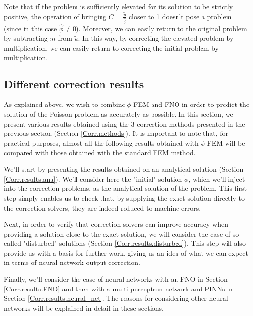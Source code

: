 \begin{Rem}
	Note that if the problem is sufficiently elevated for its solution to be strictly positive, the operation of bringing $C=\frac{\tilde{u}}{\hat{\phi}}$ closer to 1 doesn't pose a problem (since in this case $\hat{\phi}\ne 0$). Moreover, we can easily return to the original problem by subtracting $m$ from $\tilde{u}$. In this way, by correcting the elevated problem by multiplication, we can easily return to correcting the initial problem by multiplication.  
\end{Rem}

\subsection{Different correction results} \label{Corr.results}

As explained above, we wish to combine $\phi$-FEM and FNO in order to predict the solution of the Poisson problem as accurately as possible. In this section, we present various results obtained using the 3 correction methods presented in the previous section (Section \ref{Corr.methods}). It is important to note that, for practical purposes, almost all the following results obtained with $\phi$-FEM will be compared with those obtained with the standard FEM method.

We'll start by presenting the results obtained on an analytical solution (Section \ref{Corr.results.ana}). We'll consider here the "initial" solution $\tilde{\phi}$, which we'll inject into the correction problems, as the analytical solution of the problem. This first step simply enables us to check that, by supplying the exact solution directly to the correction solvers, they are indeed reduced to machine errors.

Next, in order to verify that correction solvers can improve accuracy when providing a solution close to the exact solution, we will consider the case of so-called "disturbed" solutions (Section \ref{Corr.results.disturbed}). This step will also provide us with a basis for further work, giving us an idea of what we can expect in terms of neural network output correction.

Finally, we'll consider the case of neural networks with an FNO in Section \ref{Corr.results.FNO} and then with a multi-perceptron network and PINNs in Section \ref{Corr.results.neural_net}. The reasons for considering other neural networks will be explained in detail in these sections.

